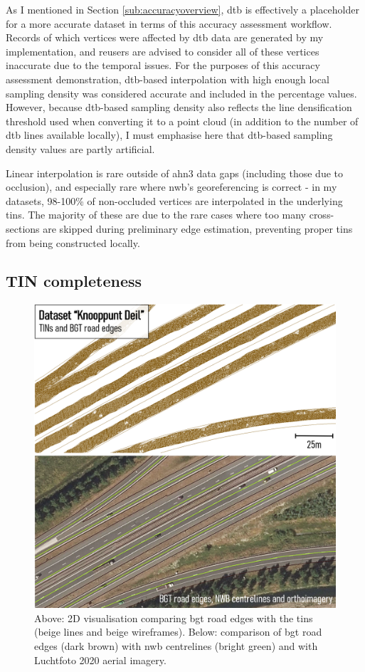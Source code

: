 As I mentioned in Section \ref{sub:accuracyoverview}, \ac{dtb} is effectively a placeholder for a more accurate dataset in terms of this accuracy assessment workflow. Records of which vertices were affected by \ac{dtb} data are generated by my implementation, and reusers are advised to consider all of these vertices inaccurate due to the temporal issues. For the purposes of this accuracy assessment demonstration, \ac{dtb}-based interpolation with high enough local sampling density was considered accurate and included in the percentage values. However, because \ac{dtb}-based sampling density also reflects the line densification threshold used when converting it to a point cloud (in addition to the number of \ac{dtb} lines available locally), I must emphasise here that \ac{dtb}-based sampling density values are partly artificial.

Linear interpolation is rare outside of \ac{ahn3} data gaps (including those due to occlusion), and especially rare where \ac{nwb}'s georeferencing is correct - in my datasets, 98-100\% of non-occluded vertices are interpolated in the underlying \ac{tin}s. The majority of these are due to the rare cases where too many cross-sections are skipped during preliminary edge estimation, preventing proper \ac{tin}s from being constructed locally.

\subsection{TIN completeness}
\label{sub:tincompleteness}

\begin{figure}[h]
    \centering
    \includegraphics[width=0.8\linewidth]{final_report/figs/bgtcomparison.png}
    \caption[2D comparison renders of NWB, BGT and aerial imagery]{Above: 2D visualisation comparing \ac{bgt} road edges with the \ac{tin}s (beige lines and beige wireframes). Below: comparison of \ac{bgt} road edges (dark brown) with \ac{nwb} centrelines (bright green) and with Luchtfoto 2020 aerial imagery.}
    \label{fig:bgtcomparison}
\end{figure}

